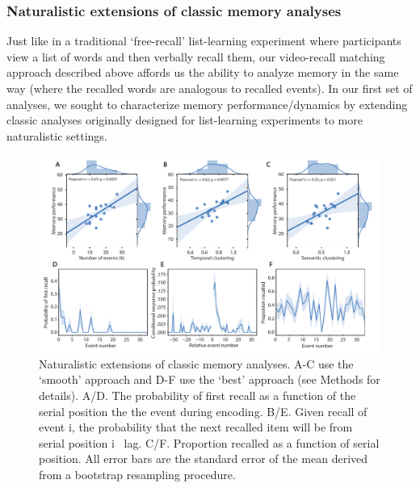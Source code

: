 \documentclass{article}
\begin{document}
{\subsubsection{Naturalistic extensions of classic memory analyses}
Just like in a traditional `free-recall' list-learning experiment where participants view a list of words and then verbally recall them, our video-recall matching approach described above affords us the ability to analyze memory in the same way (where the recalled words are analogous to recalled events). In our first set of analyses, we sought to characterize memory performance/dynamics by extending classic analyses originally designed for list-learning experiments to more naturalistic settings.

\begin{figure}[ht!]
\centering
\includegraphics[width=1\textwidth]{figs/4_behav_eventseg.pdf}
\caption{\label{fig:behav}Naturalistic extensions of classic memory analyses. A-C use the `smooth' approach and D-F use the `best' approach (see Methods for details). A/D. The probability of first recall as a function of the serial position the the event during encoding. B/E. Given recall of event i, the probability that the next recalled item will be from serial position i \rpm~lag. C/F. Proportion recalled as a function of serial position. All error bars are the standard error of the mean derived from a bootstrap resampling procedure.
}
\end{figure}

}
\end{document}
